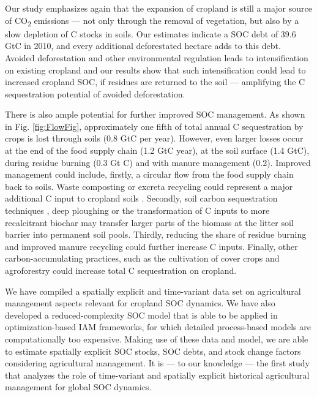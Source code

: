 \documentclass[gc, manuscript]{copernicus}
\begin{document}
Our study emphasizes again that the expansion of cropland is still a major source of CO\textsubscript{2} emissions --- not only through the removal of vegetation, but also by a slow depletion of C stocks in soils. Our estimates indicate a SOC debt of 39.6 GtC in 2010, and every additional deforestated hectare adds to this debt. Avoided deforestation and other environmental regulation leads to intensification on existing cropland \citep{humpenoder_large-scale_2018} and our results show that such intensification could lead to increased cropland SOC, if residues are returned to the soil --- amplifying the C sequestration potential of avoided deforestation.

There is also ample potential for further improved SOC management. As shown in Fig. \ref{fig:FlowFig}, approximately one fifth of total annual C sequestration by crops is lost through soils (0.8 GtC per year). However, even larger losses occur at the end of the food supply chain (1.2 GtC year), at the soil surface (1.4 GtC), during residue burning (0.3 Gt C) and with manure management (0.2). Improved management could include, firstly, a circular flow from the food supply chain back to soils. Waste composting or excreta recycling could represent a major additional C input to cropland soils \citep{brenzinger_organic_2018}. Secondly, soil carbon sequestration techniques \citep{smith_soil_2016}, deep ploughing \citep{alcantara_deep_2016} or the transformation of C inputs to more recalcitrant biochar \citep{woolf_sustainable_2010} may transfer larger parts of the biomass at the litter soil barrier into permanent soil pools. Thirdly, reducing the share of residue burning and improved manure recycling could further increase C inputs. Finally, other carbon-accumulating practices, such as the cultivation of cover crops \citep{poeplau_carbon_2015, porwollik_covercrops_2022} and agroforestry \citep{lorenz_soil_2014} could increase total C sequestration on cropland.
\newpage

\conclusions

We have compiled a spatially explicit and time-variant data set on agricultural management aspects relevant for cropland SOC dynamics. We have also developed a reduced-complexity SOC model that is able to be applied in optimization-based IAM frameworks, for which detailed process-based models are computationally too expensive. Making use of these data and model, we are able to estimate spatially explicit SOC stocks, SOC debts, and stock change factors considering agricultural management. It is --- to our knowledge --- the first study that analyzes the role of time-variant and spatially explicit historical agricultural management for global SOC dynamics.
\end{document}
